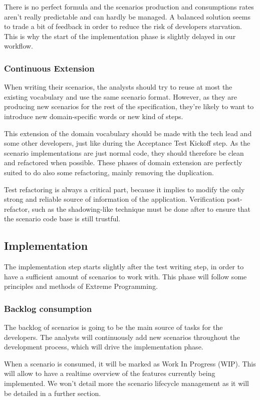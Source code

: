There is no perfect formula and the scenarios production and consumptions
rates aren't really predictable and can hardly be managed.
A balanced solution seems to trade a bit of feedback in order to reduce the
risk of developers starvation.
This is why the start of the implementation phase is slightly delayed in our
workflow.

\subsubsection{Continuous Extension}
When writing their scenarios, the analysts should try to reuse at most the
existing vocabulary and use the same scenario format.
However, as they are producing new scenarios for the rest of the
specification, they're likely to want to introduce new domain-specific words or
new kind of steps.

This extension of the domain vocabulary should be made with the tech lead and
some other developers, just like during the Acceptance Test Kickoff step.
As the scenario implementations are just normal code, they should therefore be
clean and refactored when possible.
These phases of domain extension are perfectly suited to do also some
refactoring, mainly removing the duplication.

Test refactoring is always a critical part, because it implies to modify the
only strong and reliable source of information of the application.
Verification post-refactor, such as the shadowing-like technique must be done
after to ensure that the scenario code base is still trustful.

\subsection{Implementation}\label{subsec:implementation}
The implementation step starts slightly after the test writing step, in order
to have a sufficient amount of scenarios to work with.
This phase will follow some principles and methods of Extreme Programming.

\subsubsection{Backlog consumption}
The backlog of scenarios is going to be the main source of tasks for the
developers.
The analysts will continuously add new scenarios throughout the
development process, which will drive the implementation phase.

When a scenario is consumed, it will be marked as Work In Progress (WIP).
This will allow to have a realtime overview of the features currently being
implemented.
We won't detail more the scenario lifecycle management as it will be detailed
in a further section.

